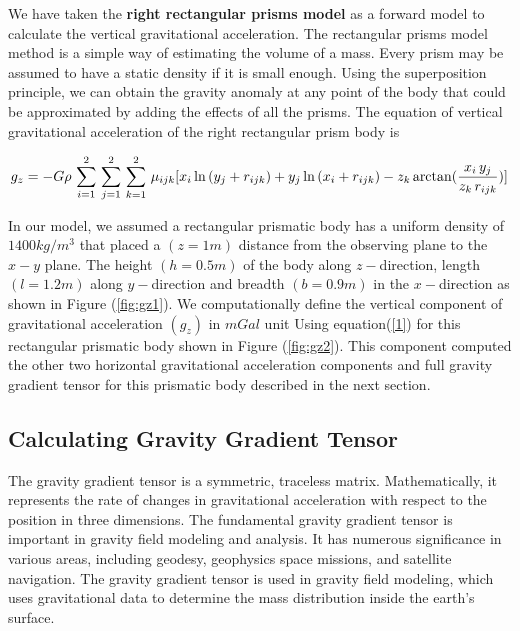 \documentclass[a4paper,11pt]{article}
\begin{document}
We have taken the \textbf{right rectangular prisms model} as a forward model to calculate the vertical gravitational acceleration. The rectangular prisms model method is a simple way of estimating the volume of a mass. Every prism may be assumed to have a static density if it is small enough. Using the superposition principle, we can obtain the gravity anomaly at any point of the body that could be approximated by adding the effects of all the prisms.
The equation of vertical gravitational acceleration of the right rectangular prism body is \cite{li1998three}


\begin{equation} \label{1}
    g_{z} = -G \rho\,\sum_{i=1}^{2}\,\sum_{j=1}^{2}\,\sum_{k=1}^{2}\,\mu_{ijk}[x_{i}\ln{(y_{j}+r_{ijk})}+y_{j}\ln{(x_{i}+r_{ijk})} \\
    - z_{k}\arctan(\frac{x_{i}\,y_{j}}{z_{k}\,r_{ijk}})]
\end{equation}

\noindent In our model, we assumed a rectangular prismatic body has a uniform density of $1400 kg/m^3$ that placed a $(z=1m)$ distance from the observing plane to the $x-y$ plane. The height $(h=0.5m)$ of the body along $z-$direction, length$(l=1.2m)$ along $y-$direction and breadth $(b=0.9m)$ in the $x-$direction as shown in Figure (\ref{fig:gz1}). We computationally define the vertical component of gravitational acceleration $(g_{z})$ in $mGal$ unit Using equation(\ref{1}) for this rectangular prismatic body shown in Figure (\ref{fig:gz2}). This component computed the other two horizontal gravitational acceleration components and full gravity gradient tensor for this prismatic body described in the next section. 

\subsection{Calculating Gravity Gradient Tensor}
The gravity gradient tensor is a symmetric, traceless matrix. Mathematically, it represents the rate of changes in gravitational acceleration with respect to the position in three dimensions. The fundamental gravity gradient tensor is important in gravity field modeling and analysis. It has numerous significance in various areas, including geodesy, geophysics space missions, and satellite navigation. The gravity gradient tensor is used in gravity field modeling, which uses gravitational data to determine the mass distribution inside the earth's surface.
\end{document}

